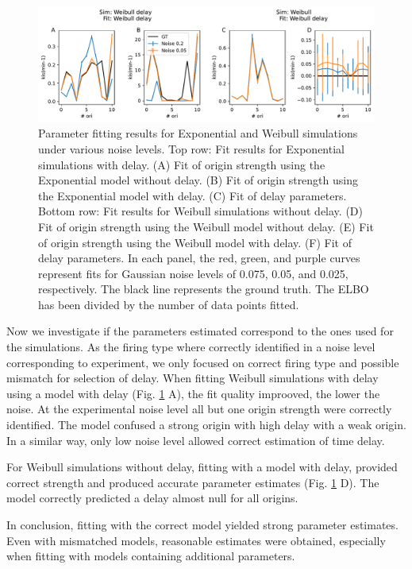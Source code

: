 \documentclass[10pt,a4paper]{revtex4-2}
\begin{document}
\begin{figure}
\includegraphics[width=1\textwidth]{figures/Parameter-estimation.pdf}

\caption{Parameter fitting results for Exponential and Weibull simulations under various noise levels. 
Top row: Fit results for Exponential simulations with delay. (A) Fit of origin strength using the Exponential model without delay. (B) Fit of origin strength using the Exponential model with delay. (C) Fit of delay parameters. 
Bottom row: Fit results for Weibull simulations without delay. (D) Fit of origin strength using the Weibull model without delay. (E) Fit of origin strength using the Weibull model with delay. (F) Fit of delay parameters. In each panel, the red, green, and purple curves represent fits for Gaussian noise levels of 0.075, 0.05, and 0.025, respectively. The black line represents the ground truth. The ELBO has been divided by the number of data points fitted.}\label{fig:syntheticparameter}
\end{figure}

Now we investigate if the parameters estimated correspond to the ones used for the simulations.
As the firing type where correctly identified in a noise level corresponding to experiment, we only focused on correct firing type and possible mismatch for selection of delay.
When fitting Weibull simulations with delay using a model with delay (Fig. \ref{fig:syntheticparameter} A), the fit quality improoved, the lower the noise. At the experimental noise level all but one origin strength were correctly identified.
The model confused a strong origin with high delay with a weak origin.
In a similar way, only low noise level allowed correct estimation of time delay.

For Weibull simulations without delay, fitting with a model with delay, provided correct strength and  produced accurate parameter estimates (Fig. \ref{fig:syntheticparameter} D). The model correctly predicted a delay almost null for all origins.

In conclusion, fitting with the correct model yielded strong parameter estimates. Even with mismatched models, reasonable estimates were obtained, especially when fitting with models containing additional parameters.
\end{document}
